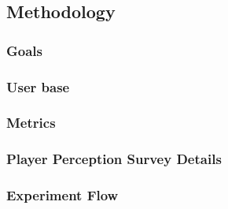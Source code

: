 \subsection{Methodology}

\subsubsection{Goals}


\subsubsection{User base}




\subsubsection{Metrics}


\subsubsection{Player Perception Survey Details}

\subsubsection{Experiment Flow}

